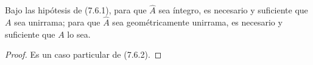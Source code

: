 \begin{corollary}[7.6.3]
\label{IV.2.s7.6.3-fr}
Bajo las hipótesis de \textup{(7.6.1)}, para que $\widehat A$ sea íntegro,
es necesario y suficiente que $A$ sea unirrama; para que
$\widehat A$ sea geométricamente unirrama, es necesario y suficiente
que $A$ lo sea.
\end{corollary}

\begin{proof}
Es un caso particular de (7.6.2).
\end{proof}
